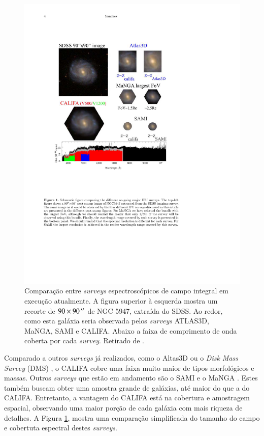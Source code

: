 \begin{figure}
	\includegraphics{figuras/surveysIFS}
	\caption[Comparação entre {\em surveys} espectroscópicos de campo integral]
	{Comparação entre {\em surveys} espectroscópicos de campo integral em execução
	atualmente. A figura superior à esquerda mostra um recorte de $90 \times
	90\,^{\prime\prime}$ de NGC 5947, extraída do SDSS. Ao redor, como esta galáxia seria
	observada pelos {\em surveys} ATLAS3D, MaNGA, SAMI e CALIFA. Abaixo a faixa de
	comprimento de onda coberta por cada {\em survey}. Retirado de
	\citet{Sanchez2014}.}
	\label{fig:surveysIFS}
\end{figure}

Comparado a outros {\em surveys} já realizados, como o Altas3D
\citep{Cappellari2011} ou o {\em Disk Mass Survey} (DMS) \citep{Bershady2010}, o
CALIFA cobre uma faixa muito maior de tipos morfológicos e massas. Outros {\em
surveys} que estão em andamento são o SAMI \citep{Croom2012, Bryant2015} e o
MaNGA \citep{Bundy2015}. Estes também buscam obter uma amostra grande de
galáxias, até maior do que a do CALIFA. Entretanto, a vantagem do CALIFA está na
cobertura e amostragem espacial, observando uma maior porção de cada galáxia com
mais riqueza de detalhes. A Figura \ref{fig:surveysIFS}, mostra uma comparação
simplificada do tamanho do campo e cobertuta espectral destes {\em surveys}.


